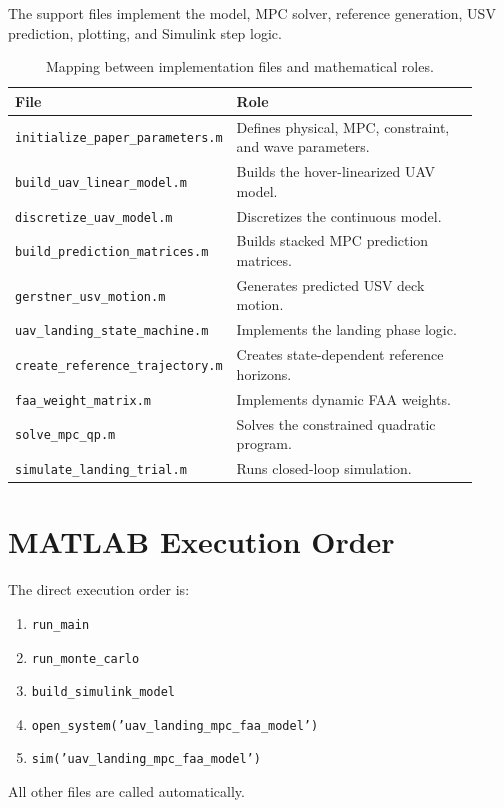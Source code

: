 \documentclass[12pt,a4paper]{report}
\begin{document}
The support files implement the model, MPC solver, reference generation, USV prediction, plotting, and Simulink step logic.

\begin{table}[H]
\centering
\caption{Mapping between implementation files and mathematical roles.}
\begin{tabular}{p{0.36\linewidth}p{0.56\linewidth}}
\toprule
File & Role\\
\midrule
\texttt{initialize\_paper\_parameters.m} & Defines physical, MPC, constraint, and wave parameters.\\
\texttt{build\_uav\_linear\_model.m} & Builds the hover-linearized UAV model.\\
\texttt{discretize\_uav\_model.m} & Discretizes the continuous model.\\
\texttt{build\_prediction\_matrices.m} & Builds stacked MPC prediction matrices.\\
\texttt{gerstner\_usv\_motion.m} & Generates predicted USV deck motion.\\
\texttt{uav\_landing\_state\_machine.m} & Implements the landing phase logic.\\
\texttt{create\_reference\_trajectory.m} & Creates state-dependent reference horizons.\\
\texttt{faa\_weight\_matrix.m} & Implements dynamic FAA weights.\\
\texttt{solve\_mpc\_qp.m} & Solves the constrained quadratic program.\\
\texttt{simulate\_landing\_trial.m} & Runs closed-loop simulation.\\
\bottomrule
\end{tabular}
\end{table}

\section{MATLAB Execution Order}
The direct execution order is:
\begin{enumerate}
    \item \texttt{run\_main}
    \item \texttt{run\_monte\_carlo}
    \item \texttt{build\_simulink\_model}
    \item \texttt{open\_system('uav\_landing\_mpc\_faa\_model')}
    \item \texttt{sim('uav\_landing\_mpc\_faa\_model')}
\end{enumerate}
All other files are called automatically.
\end{document}
